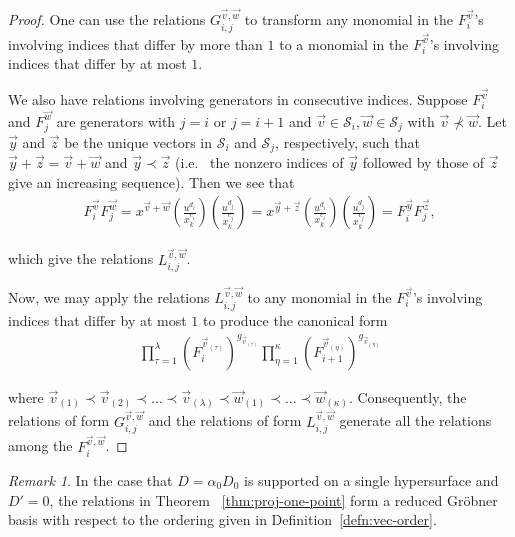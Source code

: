 \documentclass{amsart}
\theoremstyle{plain}
\theoremstyle{definition}
\theoremstyle{remark}
\newtheorem{rem}[thm]{Remark}
\numberwithin{equation}{section}
\newcommand\mss{\mathscr{S}}
\begin{document}
\begin{proof}
One can use the relations $G_{i, j}^{\vec{v}, \vec{w}}$
to transform any monomial in the $F_i^{\vec{v}}$'s involving
indices that differ by more than $1$ to a monomial in the $F_i
^{\vec{v}}$'s involving indices that differ by at most $1$.

We also have relations involving generators in consecutive
indices. Suppose $F_i^{\vec{v}}$ and $F_j^{\vec{w}}$ are
generators with $j = i$ or $j = i + 1$ and $\vec{v} \in
\mss_i, \vec{w} \in \mss_j$ with $\vec{v} \not\prec \vec{w}$.
Let $\vec{y}$ and $\vec{z}$ be the unique vectors in $\mss_i$ and
$\mss_j$, respectively, such that $\vec{y} + \vec{z} = \vec{v} +
\vec{w}$ and $\vec{y} \prec \vec{z}$ (i.e.~ the nonzero indices
of $\vec{y}$ followed by those of $\vec{z}$ give an increasing
sequence). Then we see that
\begin{align*}
	F_i^{\vec{v}} F_j^{\vec{w}} = x^{\vec{v} + \vec{w}}
	\left(\frac{u^{d_i}}{x_k^{c_i}}\right)
	\left(\frac{u^{d_j}}{x_k^{c_j}}\right)
	= x^{\vec{y} + \vec{z}}
	\left(\frac{u^{d_i}}{x_k^{c_i}}\right)
	\left(\frac{u^{d_j}}{x_k^{c_j}}\right)
	= F_i^{\vec{y}} F_j^{\vec{z}},
\end{align*}

\noindent 
which give the relations $L_{i, j}^{\vec{v}, \vec{w}}$.

Now, we may apply the relations $L_{i, j}^{\vec{v}, \vec{w}}$
to any monomial in the $F_i^{\vec{v}}$'s involving
indices that differ by at most $1$ to produce the canonical form
\begin{align*}
	\prod_{\tau=1}^\lambda (F_i^{\vec{v}_{(\tau)}})^{g_{\vec{v}_{(\tau)}}}
	\prod_{\eta=1}^\kappa (F_{i+1}^{\vec{v}_{(\eta)}})^{g_{\vec{v}_{(\eta)}}}
\end{align*}

\noindent
where $\vec{v}_{(1)} \prec \vec{v}_{(2)} \prec \ldots \prec
\vec{v}_{(\lambda)} \prec \vec{w}_{(1)} \prec \ldots \prec
\vec{w}_{(\kappa)}$. Consequently, the relations of form
$G_{i, j}^{\vec{v}, \vec{w}}$ and the relations of form
$L_{i, j}^{\vec{v}, \vec{w}}$ generate all the relations among the
$F_{i}^{\vec{v}, \vec{w}}$.
\end{proof}

\begin{rem}
\label{rem:proj-grobner}
	In the case that $D = \alpha_0 D_0$ is supported on a single
	hypersurface and $D' = 0$, the relations in Theorem ~\ref{thm:proj-one-point}
	form a reduced Gr\"{o}bner basis with respect to the ordering
	given in Definition~\ref{defn:vec-order}.
\end{rem}
\end{document}
